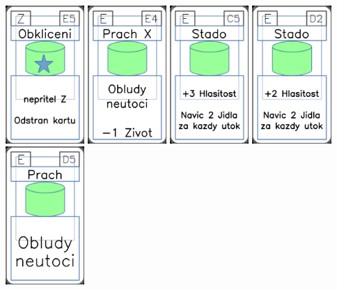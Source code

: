 \documentclass[a4paper]{article}
\begin{document}
	\includegraphics[width=3.0cm]{img-5_54}
	\includegraphics[width=3.0cm]{img-4_53}
	\includegraphics[width=3.0cm]{img-4_44}
	\includegraphics[width=3.0cm]{img-4_46}
	\includegraphics[width=3.0cm]{img-4_49}
\end{document}
